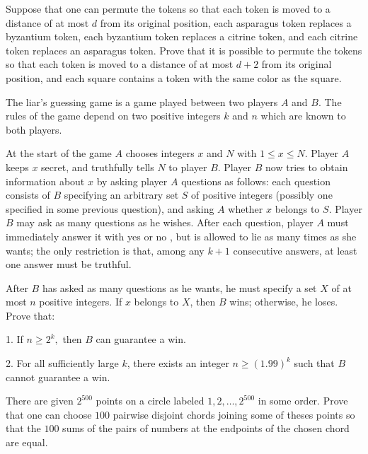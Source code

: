 Suppose that one can permute the tokens so that each token is moved to a distance of at most 
$d$
 from its original position, each asparagus token replaces a byzantium token, each byzantium token replaces a citrine token, and each citrine token replaces an asparagus token. Prove that it is possible to permute the tokens so that each token is moved to a distance of at most 
$d+2$
 from its original position, and each square contains a token with the same color as the square.

\item[\textbf{C6.}]
The 
liar's guessing game
 is a game played between two players 
$A$
 and 
$B$.
 The rules of the game depend on two positive integers 
$k$
 and 
$n$
 which are known to both players.


At the start of the game 
$A$
 chooses integers 
$x$
 and 
$N$
 with 
$1 \le x \le N.$
 Player 
$A$
 keeps 
$x$
 secret, and truthfully tells 
$N$
 to player 
$B$.
 Player 
$B$
 now tries to obtain information about 
$x$
 by asking player 
$A$
 questions as follows: each question consists of 
$B$
 specifying an arbitrary set 
$S$
 of positive integers (possibly one specified in some previous question), and asking 
$A$
 whether 
$x$
 belongs to 
$S$.
 Player 
$B$
 may ask as many questions as he wishes. After each question, player 
$A$
 must immediately answer it with 
yes
 or 
no
, but is allowed to lie as many times as she wants; the only restriction is that, among any 
$k+1$
 consecutive answers, at least one answer must be truthful.


After 
$B$
 has asked as many questions as he wants, he must specify a set 
$X$
 of at most 
$n$
 positive integers. If 
$x$
 belongs to 
$X$, 
 then 
$B$
 wins; otherwise, he loses. Prove that:


1. If 
$n \ge 2^k,$
 then 
$B$
 can guarantee a win.


2. For all sufficiently large 
$k$, 
 there exists an integer 
$n \ge (1.99)^k$
 such that 
$B$
 cannot guarantee a win.

\item[\textbf{C7.}]
There are given 
$2^{500}$
 points on a circle labeled 
$1,2,\ldots ,2^{500}$
 in some order. Prove that one can choose 
$100$
 pairwise disjoint chords joining some of theses points so that the 
$100$
 sums of the pairs of numbers at the endpoints of the chosen chord are equal.

